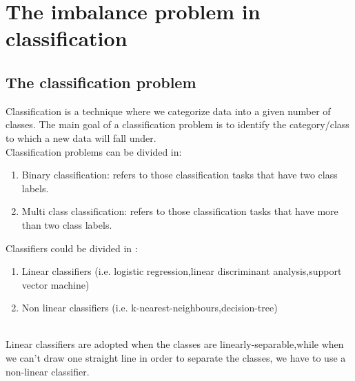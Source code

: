 \chapter{The imbalance problem in classification }

\section{The classification problem}

Classification is a technique where we categorize data into a given number of classes. The main goal of a classification problem is to identify the category/class to which a new data will fall under. \\
Classification problems can be divided in:  
\begin{enumerate}
\item{  Binary classification: refers to those classification tasks that have two class labels.} 
\item{ Multi class classification: refers to those classification tasks that have more than two class labels.} 
\end{enumerate}
Classifiers could be divided in :  
\begin{enumerate}
\item{ Linear classifiers (i.e. logistic regression,linear discriminant analysis,support vector machine)}
\item{ Non linear classifiers (i.e. k-nearest-neighbours,decision-tree)}
\end{enumerate} \\

Linear classifiers are adopted when the classes are  linearly-separable,while when we can't draw one straight line in order to separate the classes, we have to use a non-linear classifier.




